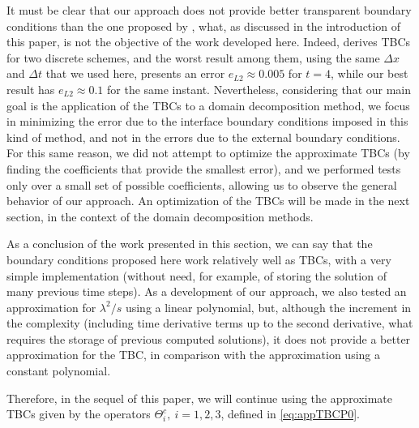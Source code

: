 \indent It must be clear that our approach does not provide better transparent boundary conditions than the one proposed by \cite{besse2015}, what, as discussed in the introduction of this paper, is not the objective of the work developed here. Indeed, \cite{besse2015} derives TBCs for two discrete schemes, and the worst result among them, using the same $\Delta x $ and $\Delta t$ that we used here, presents an error $e_{L2} \approx 0.005$ for $t = 4$, while our best result has $e_{L2} \approx 0.1$ for the same instant. Nevertheless, considering that our main goal is the application of the TBCs to a domain decomposition method, we focus in minimizing the error due to the interface boundary conditions imposed in this kind of method, and not in the errors due to the external boundary conditions. For this same reason, we did not attempt to optimize the approximate TBCs (by finding the coefficients that provide the smallest error), and we performed tests only over a small set of possible coefficients, allowing us to observe the general behavior of our approach. An optimization of the TBCs will be made in the next section, in the context of the domain decomposition methods.

\indent As a conclusion of the work presented in this section, we can say that the boundary conditions proposed here work relatively well as TBCs, with a very simple implementation (without need, for example, of storing the solution of many previous time steps). As a development of our approach, we also tested an approximation for $\lambda^2/s$ using a linear polynomial, but, although the increment in the complexity (including time derivative terms up to the second derivative, what requires the storage of previous computed solutions), it does not provide a better approximation for the TBC, in comparison with the approximation using a constant polynomial.

\indent Therefore, in the sequel of this paper, we will continue using the approximate TBCs given by the operators $\Theta_i^{c}, \ i=1,2,3$, defined in \eqref{eq:appTBCP0}.